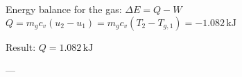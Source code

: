 Energy balance for the gas:  
\( \Delta E = Q - W \)  
\( Q = m_g c_v (u_2 - u_1) = m_g c_v (T_2 - T_{g,1}) = -1.082 \, \text{kJ} \)  

Result:  
\( Q = 1.082 \, \text{kJ} \)  

---